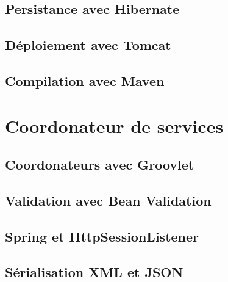 \documentclass{article}
\begin{document}
\subsection{Persistance avec Hibernate} %
\label{sub:persistance_avec_hibernate}

\subsection{Déploiement avec Tomcat} %
\label{sub:deploiement_avec_tomcat}

\subsection{Compilation avec Maven} %
\label{sub:service_metier_compilation_avec_maven}


\section{Coordonateur de services} %
\label{sec:coordonateur_de_services}

\subsection{Coordonateurs avec Groovlet} %
\label{sub:coordonateurs_avec_groovlet}

\subsection{Validation avec Bean Validation} %
\label{sub:validation_avec_bean_validation}

\subsection{Spring et HttpSessionListener} %
\label{sub:spring_et_httpsessionlistener}

\subsection{Sérialisation XML et JSON} %
\label{sub:serialisation_xml_et_json}
\end{document}
